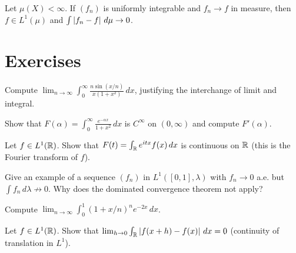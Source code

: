 \begin{theorem}[Vitali]
\label{thm:vitali_convergence}
Let $\mu(X) < \infty$. If $(f_n)$ is uniformly integrable and $f_n \to f$ in
measure, then $f \in L^1(\mu)$ and $\int \left| f_n - f \right|\, d\mu \to 0$.
\end{theorem}

\section{Exercises}

\begin{exercise}
Compute $\lim_{n \to \infty} \int_0^{\infty}
\frac{n \sin(x/n)}{x(1 + x^2)}\, dx$, justifying the interchange of limit and
integral.
\end{exercise}

\begin{exercise}
Show that $F(\alpha) = \int_0^{\infty} \frac{e^{-\alpha x}}{1 + x^2}\, dx$ is
$C^\infty$ on $(0, \infty)$ and compute $F'(\alpha)$.
\end{exercise}

\begin{exercise}
Let $f \in L^1(\mathbb{R})$. Show that $F(t) = \int_{\mathbb{R}} e^{itx} f(x)\, dx$ is continuous
on $\mathbb{R}$ (this is the Fourier transform of $f$).
\end{exercise}

\begin{exercise}
Give an example of a sequence $(f_n)$ in $L^1([0,1], \lambda)$ with $f_n \to 0$
a.e. but $\int f_n\, d\lambda \not\to 0$. Why does the dominated convergence
theorem not apply?
\end{exercise}

\begin{exercise}
Compute $\lim_{n \to \infty} \int_0^1 (1 + x/n)^n e^{-2x}\, dx$.
\end{exercise}

\begin{exercise}
Let $f \in L^1(\mathbb{R})$. Show that
$\lim_{h \to 0} \int_{\mathbb{R}} \left| f(x + h) - f(x) \right|\, dx = 0$
(continuity of translation in $L^1$).
\end{exercise}
